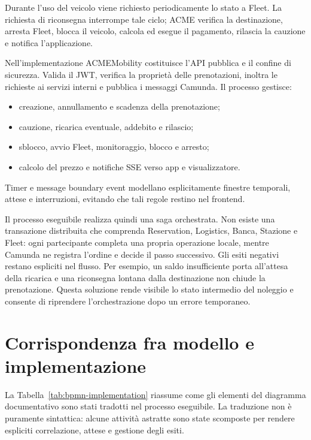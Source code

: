 \documentclass[12pt,a4paper,twoside]{report}
\begin{document}
Durante l'uso del veicolo viene richiesto periodicamente lo stato a Fleet. La
richiesta di riconsegna interrompe tale ciclo; ACME verifica la destinazione,
arresta Fleet, blocca il veicolo, calcola ed esegue il pagamento, rilascia la
cauzione e notifica l'applicazione.

Nell'implementazione ACMEMobility costituisce l'API pubblica e il confine di
sicurezza. Valida il JWT, verifica la proprietà delle prenotazioni, inoltra le
richieste ai servizi interni e pubblica i messaggi Camunda. Il processo
gestisce:
\begin{itemize}
  \item creazione, annullamento e scadenza della prenotazione;
  \item cauzione, ricarica eventuale, addebito e rilascio;
  \item sblocco, avvio Fleet, monitoraggio, blocco e arresto;
  \item calcolo del prezzo e notifiche SSE verso app e visualizzatore.
\end{itemize}
Timer e message boundary event modellano esplicitamente finestre temporali,
attese e interruzioni, evitando che tali regole restino nel frontend.

Il processo eseguibile realizza quindi una saga orchestrata. Non esiste una
transazione distribuita che comprenda Reservation, Logistics, Banca,
Stazione e Fleet: ogni partecipante completa una propria operazione locale,
mentre Camunda ne registra l'ordine e decide il passo successivo. Gli esiti
negativi restano espliciti nel flusso. Per esempio, un saldo insufficiente
porta all'attesa della ricarica e una riconsegna lontana dalla destinazione
non chiude la prenotazione. Questa soluzione rende visibile lo stato
intermedio del noleggio e consente di riprendere l'orchestrazione dopo un
errore temporaneo.

\section{Corrispondenza fra modello e implementazione}

La Tabella~\ref{tab:bpmn-implementation} riassume come gli elementi del
diagramma documentativo sono stati tradotti nel processo eseguibile. La
traduzione non è puramente sintattica: alcune attività astratte sono state
scomposte per rendere espliciti correlazione, attese e gestione degli esiti.
\end{document}
